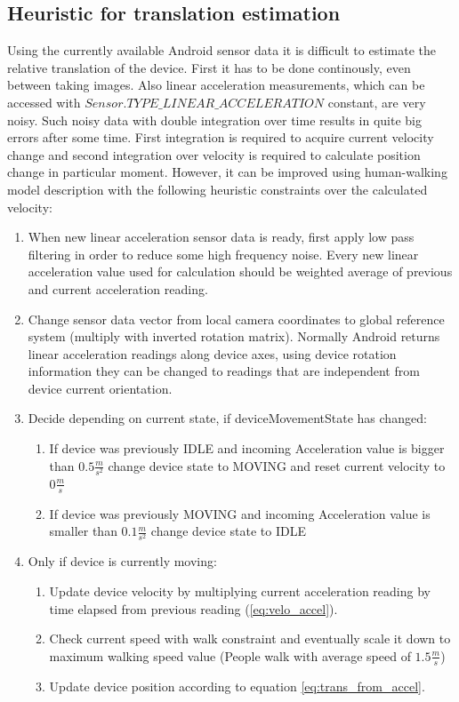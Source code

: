 \subsection{Heuristic for translation estimation}
Using the currently available Android sensor data it is difficult to estimate the relative translation of the device. First it has to be done continously, even between taking images. Also  linear acceleration measurements, which can be accessed with $Sensor.TYPE\_LINEAR\_ACCELERATION$ constant, are very noisy\cite{indoorPosition}. Such noisy data with double integration over time results in quite big errors after some time. First integration is required to acquire current velocity change and second integration over velocity is required to calculate position change in particular moment. 
However, it can be improved using human-walking model description with the following heuristic constraints over the calculated velocity:
\begin{enumerate}
\item When new linear acceleration sensor data is ready, first apply low pass filtering in order to reduce some high frequency noise. Every new linear acceleration value used for calculation should be weighted average of previous and current acceleration reading.  
\item Change sensor data vector from local camera coordinates to global reference system (multiply with inverted rotation matrix). Normally Android returns linear acceleration readings along device axes, using device rotation information they can be changed to readings that are independent from device current orientation. 
\item Decide depending on current state, if deviceMovementState has changed:
\begin{enumerate}
\item If device was previously IDLE and incoming Acceleration value is bigger than $0.5\frac{m}{s^2}$ change device state to MOVING and reset current velocity to $0\frac{m}{s}$
\item If device was previously MOVING and incoming Acceleration value is smaller than $0.1\frac{m}{s^2}$ change device state to IDLE
\end{enumerate}
\item Only if device is currently moving:
\begin{enumerate}
\item Update device velocity by multiplying current acceleration reading by time elapsed from previous reading (\ref{eq:velo_accel}). 
\item Check current speed with walk constraint and eventually scale it down to maximum walking speed value (People walk with average speed of $1.5\frac{m}{s}$)
\item Update device position according to equation \ref{eq:trans_from_accel}.
\end{enumerate}
\end{enumerate}
